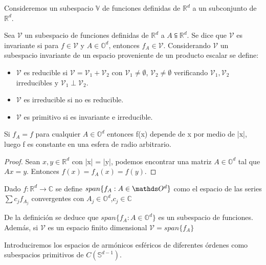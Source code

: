 Consideremos un subespacio $\mathds{V}$ de funciones definidas de $\mathds{R}^d$ a un subconjunto de $\mathds{R}^d$.
\begin{defn}
	Sea $\mathcal{V}$ un subespacio de funciones definidas de $\mathds{R}^d$ a $A \subseteqq \mathds{R}^d$. Se dice que $\mathcal{V}$ es invariante si para  $f \in \mathcal{V}$ y  $A\in\mathds{O}^d$, entonces  $f_A \in \mathcal{V}$.
	Considerando $\mathcal{V}$ un subespacio invariante de un espacio proveniente de un producto escalar se define:
	\begin{itemize}
		\item $\mathcal{V}$ es reducible si  $\mathcal{V} = \mathcal{V}_1 + \mathcal{V}_2$ con $\mathcal{V}_1 \not= \emptyset$, $\mathcal{V}_2 \not= \emptyset$ verificando $\mathcal{V}_1,\mathcal{V}_2$ irreducibles y $\mathcal{V}_1 \perp \mathcal{V}_2$.
		\item $\mathcal{V}$ es irreducible si no es reducible.
		\item $\mathcal{V}$ es primitivo si es invariante e irreducible.
	\end{itemize}
\end{defn}

\begin{prop}\label{prop:1}
Si $f_A=f$ para cualquier $A\in \mathds{O}^d$ entonces f(x) depende de x por medio de |x|, luego f es constante en una esfera de radio arbitrario.
\end{prop}

\begin{proof} Sean $x,y \in \mathds{R}^d$ con |x| = |y|, podemos encontrar una matriz $A \in \mathds{O}^d$ tal que $Ax = y$. Entonces $f(x)=f_A(x)=f(y)$.
	
\end{proof}

\begin{defn}Dado $f:\mathds{R}^d \to \mathds{C}$ se define $span\{f_A : A \in \orto\}$ como el espacio de las series $\sum c_jf_{A_j}$ convergentes con $A_j \in \mathds{O}^d$,$c_j \in \mathds{C}$ 
\end{defn}
De la definición se deduce que $span\{f_A : A \in \mathds{O}^d\}$ es un subespacio de funciones. Además, si $\mathcal{V}$ es un espacio finito dimensional $\mathcal{V} = span\{f_A\}$
\medskip

Introduciremos los espacios de armónicos esféricos de diferentes órdenes como subespacios primitivos de $C(\mathds{S}^{d-1})$. 
